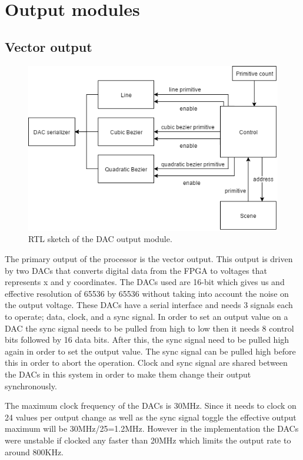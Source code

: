 \chapter{Output modules}
\label{chap:Output}

\section{Vector output}

\begin{figure}[h!]
    \includegraphics[width=\linewidth]{images/dac-output.png}
    \caption{RTL sketch of the \vthreek DAC output module.}
    \label{fig:dac-output}
\end{figure}

The primary output of the processor is the vector output.
This output is driven by two DACs that converts digital data from the FPGA to voltages that represents x and y coordinates.
The DACs used are 16-bit which gives us and effective resolution of 65536 by 65536 without taking into account the noise on the output voltage.
These DACs have a serial interface and needs 3 signals each to operate; data, clock, and a sync signal. 
In order to set an output value on a DAC the sync signal needs to be pulled from high to low then it needs 8 control bits followed by 16 data bits. 
After this, the sync signal need to be pulled high again in order to set the output value. The sync signal can be pulled high before this in order to abort the operation.
Clock and sync signal are shared between the DACs in this system in order to make them change their output synchronously.

The maximum clock frequency of the DACs is 30MHz. Since it needs to clock on 24 values per output change as well as the sync signal toggle the effective output maximum will be 30MHz/25=1.2MHz.
However in the implementation the DACs were unstable if clocked any faster than 20MHz which limits the output rate to around 800KHz.

